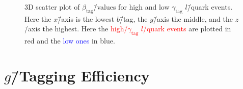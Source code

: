 \begin{figure}[h!]
  \centering
  \vspace{2mm}
  \caption[3D Scatter Plot of $\beta_\mathrm{tag}$\=/Values for High and Low $\gamma_\mathrm{tag}$ $l$\=/Quark Events]{
    3D scatter plot of $\beta_\mathrm{tag}$\=/values for high and low $\gamma_\mathrm{tag}$ $l$\=/quark events. Here the $x$\=/axis is the lowest $b$\=/tag, the $y$\=/axis
  the middle, and the $z$\=/axis the highest. Here the \textcolor{red}{high\=/$\gamma_\mathrm{tag}$ $l$\=/quark events} are plotted in red and the \textcolor{blue}{low ones} in blue.}
  \label{fig:q:gtag_scores_3j_l_quarks_3d}%
\end{figure}

\vspace{-5mm}
\section[g-Tagging Efficiency]{$g$\=/Tagging Efficiency}
\label{sec:q:g_tagging_effiency}

